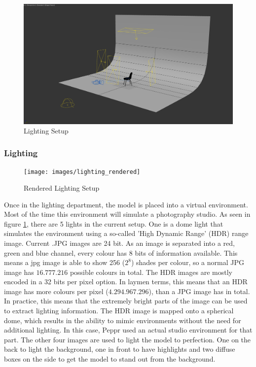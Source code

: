 \clearpage
\begin{figure}
\centering
\includegraphics[width=15cm]{images/lighting}
\caption{Lighting Setup}
\label{figure:lighting}
\end{figure}


\subsubsection{Lighting}

\begin{figure}
\vspace{-1cm}
\centering
\texttt{[image: images/lighting\_rendered]}
\caption{Rendered Lighting Setup}
\label{figure:lighting_rendered}
\end{figure}

Once in the lighting department, the model is placed into a virtual environment. Most of the time this environment will simulate a photography studio. As seen in figure \ref{figure:lighting}, there are 5 lights in the current setup. One is a dome light that simulates the environment using a so-called 'High Dynamic Range' (HDR) range image. Current .JPG images are 24 bit. As an image is separated into a red, green and blue channel, every colour has 8 bits of information available. This means a jpg image is able to show 256 ($2^8$) shades per colour, so a normal JPG image has $16.777.216$ possible colours in total. \newline
The HDR images are mostly encoded in a 32 bits per pixel option. In laymen terms, this means that an HDR image has more colours per pixel ($4.294.967.296$), than a JPG image has in total. In practice, this means that the extremely bright parts of the image can be used to extract lighting information. The HDR image is mapped onto a spherical dome, which results in the ability to mimic environments without the need for additional lighting. In this case, Peppr used an actual studio environment for that part.
 The other four images are used to light the model to perfection. One on the back to light the background, one in front to have highlights and two diffuse boxes on the side to get the model to stand out from the background.

